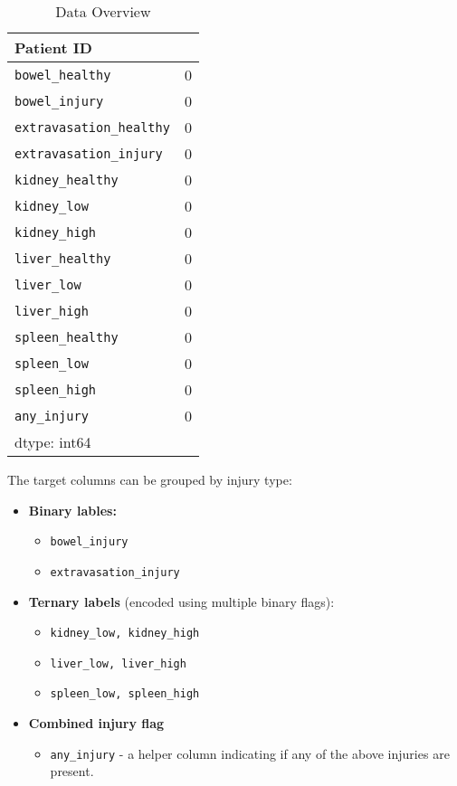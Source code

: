 \documentclass[a4paper,12pt]{article}
\begin{document}
\begin{table}[!htbp]
    \centering
        \vspace{0.2cm}
    \begin{tabular}{|l|c|}
        \hline
        \textbf{Patient ID} &  \\
        \hline
        \verb|bowel_healthy| & 0 \\
        \verb|bowel_injury| & 0 \\
        \verb|extravasation_healthy| & 0 \\
        \verb|extravasation_injury| & 0 \\
        \verb|kidney_healthy| & 0 \\
        \verb|kidney_low| & 0 \\
        \verb|kidney_high| & 0 \\
        \verb|liver_healthy| & 0 \\
        \verb|liver_low| & 0 \\
        \verb|liver_high| & 0 \\
        \verb|spleen_healthy| & 0 \\
        \verb|spleen_low| & 0 \\
        \verb|spleen_high| & 0 \\
        \verb|any_injury| & 0 \\
        dtype: int64 &  \\
        \hline
        
        \hline
    \end{tabular}
    \caption{Data Overview}
    \label{tab:data_overview}
\end{table}


The target columns can be grouped by injury type:

\begin{itemize}
    \item \textbf{Binary lables:}
    \begin{itemize}
        \item \verb|bowel_injury|
        \item \verb|extravasation_injury|
    \end{itemize}
    \item \textbf{Ternary labels }(encoded using multiple binary flags):
        \begin{itemize}
        \item \verb|kidney_low, kidney_high|
        \item \verb|liver_low, liver_high|
        \item \verb|spleen_low, spleen_high|
    \end{itemize}
    \item \textbf{Combined injury flag}
    \begin{itemize}
        \item \verb|any_injury| - a helper column indicating if any of the above injuries are present.
    \end{itemize}
\end{itemize}
\end{document}
